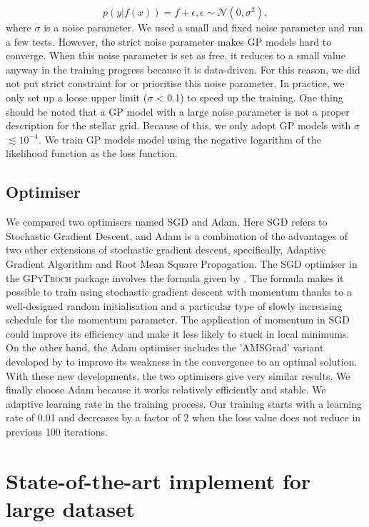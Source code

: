 \begin{equation}\label{eq:likelihood}
p(y|f(x)) = f + \epsilon, \epsilon \sim \mathcal{N}(0, \sigma^{2}),
\end{equation}
where $\sigma$ is a noise parameter. 
%
We used a small and fixed noise parameter and run a few tests.  However, the strict noise parameter makes GP models hard to converge. When this noise parameter is set as free, it reduces to a small value anyway in the training progress because it is data-driven.  For this reason, we did not put strict constraint for or prioritise this noise parameter.  In practice, we only set up a loose upper limit ($\sigma$  < 0.1) to speed up the training. One thing should be noted that a GP model with a large noise parameter is not a proper description for the stellar grid. Because of this, we only adopt GP models with $\sigma$ $\lesssim 10^{-4}$. We train GP models model using the negative logarithm of the likelihood function as the loss function.  

\subsection{Optimiser}

We compared two optimisers named SGD and Adam. Here SGD refers to Stochastic Gradient Descent, and Adam is a combination of the advantages of two other extensions of stochastic gradient descent, specifically, Adaptive Gradient Algorithm and Root Mean Square Propagation. 
%
The SGD optimiser in the \textsc{GPyTroch} package involves the formula given by \citet{sutskever2013importance}. The formula makes it possible to train using stochastic gradient descent with momentum thanks to a well-designed random initialisation and a particular type of slowly increasing schedule for the momentum parameter. The application of momentum in SGD could improve its efficiency and make it less likely to stuck in local minimums. On the other hand, the Adam optimiser includes the 'AMSGrad' variant developed by \citet{47409} to improve its weakness in the convergence to an optimal solution. With these new developments, the two optimisers give very similar results. We finally choose Adam because it works relatively efficiently and stable.  
%
We adaptive learning rate in the training process. Our training starts with a learning rate of 0.01 and decreases by a factor of 2 when the loss value does not reduce in previous 100 iterations.    


\section{State-of-the-art implement for large dataset}\label{app:B}

